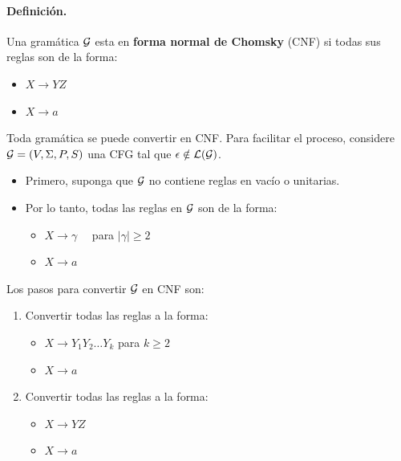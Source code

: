 \paragraph{Definición.} Una gramática $\mathcal{G}$ esta en \textbf{forma normal de Chomsky} (CNF) si todas sus reglas son de la forma:
\begin{itemize}
    \item $X \to YZ$
    \item $X \to a$
\end{itemize}
Toda gramática se puede convertir en CNF. Para facilitar el proceso, considere $\mathcal{G} = (V, \Sigma, P, S)$ una CFG tal que $\epsilon \notin \mathcal{L}(\mathcal{G})$.
\begin{itemize}
    \item Primero, suponga que $\mathcal{G}$ no contiene reglas en vacío o unitarias.
    \item Por lo tanto, todas las reglas en $\mathcal{G}$ son de la forma:
          \begin{itemize}
              \item $X \to \gamma \quad $ para $|\gamma| \geq 2$
              \item $X \to a$
          \end{itemize}
\end{itemize}

Los pasos para convertir $\mathcal{G}$ en CNF son:
\begin{enumerate}
    \item Convertir todas las reglas a la forma:
          \begin{itemize}
              \item $X \to Y_1 Y_2 \ldots Y_k$ para $k \geq 2$
              \item $X \to a$
          \end{itemize}

    \item Convertir todas las reglas a la forma:
          \begin{itemize}
              \item $X \to YZ$
              \item $X \to a$
          \end{itemize}
\end{enumerate}

